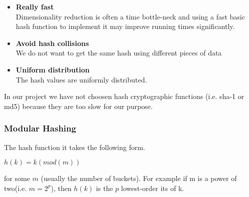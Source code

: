 \documentclass[12pt]{article}
\begin{document}
\begin{itemize}
\item \textbf{Really fast}\\
Dimensionality reduction is often a time bottle-neck and using a fast basic hash function to implement it may improve running times significantly. 
\item \textbf{Avoid hash collisions}\\
We do not want to get the same hash using different pieces of data %
\item \textbf{Uniform distribution}\\
The hash values are uniformly distributed.

\end{itemize}

In our project we have not choosen hash cryptographic functions (i.e. sha-1 or md5) because they are too slow for our purpose.


\subsubsection{Modular Hashing}

The hash function it takes the following form. 

\begin{center} $h(k) = k (mod (m))$ \end{center}

for some $m$ (usually the number of buckets). For example if m is a power of two(i.e. $m = 2^p$), then $h(k)$ is the $p$ lowest-order its of k. 


\end{document}
